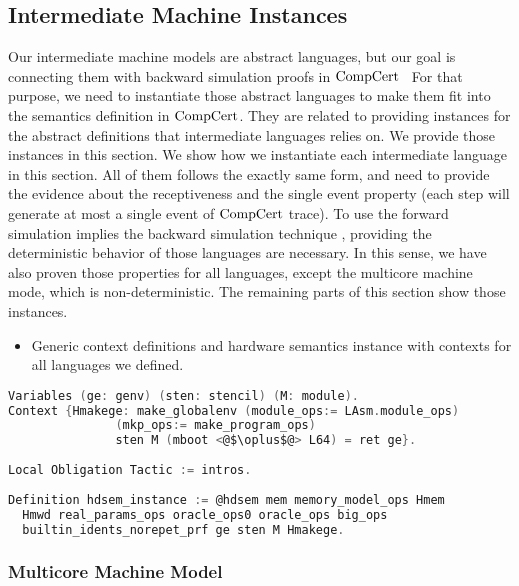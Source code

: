 
\subsection{Intermediate Machine Instances}
\label{chapter:certikos:subsec:intermediate-machine-instantiation}

Our intermediate machine models are abstract languages, but 
our goal is connecting them with backward simulation proofs in $\mathrm{CompCert}$~
For that purpose, 
we need to instantiate those abstract languages to make them fit into 
the semantics definition in $\mathrm{CompCert}$.
They are related to
providing instances 
for the abstract definitions that intermediate languages relies on. 
We provide those instances in this section. 
We show how we instantiate each intermediate language 
in this section. All of them follows the exactly same form, 
and need to provide the evidence about the receptiveness and the single event property (each step will generate at most a single event of $\mathrm{CompCert}$ trace). 
To use the forward simulation implies the backward simulation technique ,
providing the deterministic behavior of those languages 
are necessary. 
In this sense, 
we have also proven those properties 
for all languages, except the multicore machine mode, which is non-deterministic. 
The remaining parts of this section 
show those instances.

\begin{itemize}[leftmargin=*]
\item Generic context definitions and hardware semantics instance with contexts for all languages we defined.
\end{itemize}
\begin{lstlisting}[language=C]
Variables (ge: genv) (sten: stencil) (M: module).
Context {Hmakege: make_globalenv (module_ops:= LAsm.module_ops)
               (mkp_ops:= make_program_ops) 
               sten M (mboot <@$\oplus$@> L64) = ret ge}.        
    
Local Obligation Tactic := intros.
    
Definition hdsem_instance := @hdsem mem memory_model_ops Hmem 
  Hmwd real_params_ops oracle_ops0 oracle_ops big_ops 
  builtin_idents_norepet_prf ge sten M Hmakege.    
\end{lstlisting}

\subsubsection{Multicore Machine Model}

